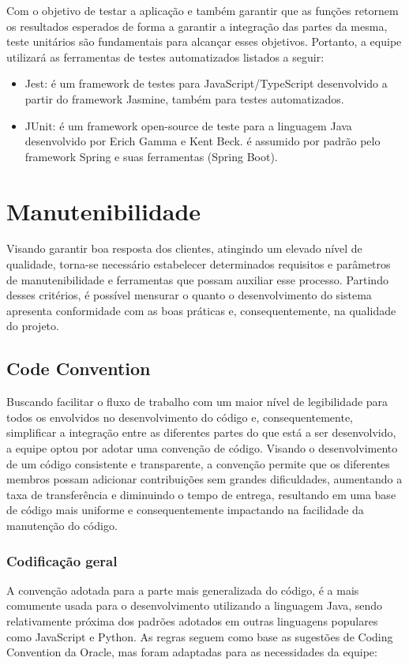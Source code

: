 \documentclass[
    12pt,               %
    openright,          %
    oneside,
    a4paper,            %
    BIBLATEX,           %
    TODO,               %
    english,            %
    brazil              %
    ]{ifsp-spo-inf-ctds}
\begin{document}
            Com o objetivo de testar a aplicação e também garantir que as funções retornem os resultados esperados de forma a garantir a integração das partes da mesma, teste unitários são fundamentais para alcançar esses objetivos. Portanto, a equipe utilizará as ferramentas de testes automatizados listados a seguir:
            
            \begin{itemize}
                \item Jest: é um framework de testes para JavaScript/TypeScript desenvolvido a partir do framework Jasmine, também para testes automatizados.
                \item JUnit: é um framework open-source de teste para a linguagem Java desenvolvido por Erich Gamma e Kent Beck. é assumido por padrão pelo framework Spring e suas ferramentas (Spring Boot).
            \end{itemize}

    

    \section{Manutenibilidade}
    Visando garantir boa resposta dos clientes, atingindo um elevado nível de qualidade, torna-se necessário estabelecer determinados requisitos e parâmetros de manutenibilidade e ferramentas que possam auxiliar esse processo. Partindo desses critérios, é possível mensurar o quanto o desenvolvimento do sistema apresenta conformidade com as boas práticas e, consequentemente, na qualidade do projeto.

        \subsection{Code Convention}
        Buscando facilitar o fluxo de trabalho com um maior nível de legibilidade para todos os envolvidos no desenvolvimento do código e, consequentemente, simplificar a integração entre as diferentes partes do que está a ser desenvolvido, a equipe optou por adotar uma convenção de código. Visando o desenvolvimento de um código consistente e transparente, a convenção permite que os diferentes membros possam adicionar contribuições sem grandes dificuldades, aumentando a taxa de transferência e diminuindo o tempo de entrega, resultando em uma base de código mais uniforme e consequentemente impactando na facilidade da manutenção do código.

        \subsubsection{Codificação geral}
        A convenção adotada para a parte mais generalizada do código, é a mais comumente usada para o desenvolvimento utilizando a linguagem Java, sendo relativamente próxima dos padrões adotados em outras linguagens populares como JavaScript e Python. As regras seguem como base as sugestões de Coding Convention da Oracle, mas foram adaptadas para as necessidades da equipe:
\end{document}
